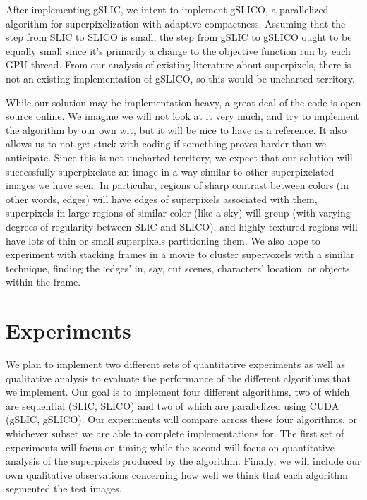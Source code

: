 \documentclass[11pt]{article}
\begin{document}
After implementing gSLIC, we intent to implement gSLICO, a parallelized algorithm for superpixelization with adaptive compactness. Assuming that the step from SLIC to SLICO is small, the step from gSLIC to gSLICO ought to be equally small since it's primarily a change to the objective function run by each GPU thread. From our analysis of existing literature about superpixels, there is not an existing implementation of gSLICO, so this would be uncharted territory.

While our solution may be implementation heavy, a great deal of the code is open source online. We imagine we will not look at it very much, and try to implement the algorithm by our own wit, but it will be nice to have as a reference. It also allows us to not get stuck with coding if something proves harder than we anticipate. Since this is not uncharted territory, we expect that our solution will successfully superpixelate an image in a way similar to other superpixelated images we have seen. In particular, regions of sharp contrast between colors (in other words, edges) will have edges of superpixels associated with them, superpixels in large regions of similar color (like a sky) will group (with varying degrees of regularity between SLIC and SLICO), and highly textured regions will have lots of thin or small superpixels partitioning them. We also hope to experiment with stacking frames in a movie to cluster supervoxels with a similar technique, finding the `edges' in, say, cut scenes, characters' location, or objects within the frame.

\section {Experiments}\label{exper}

We plan to implement two different sets of quantitative experiments as well as qualitative analysis to evaluate the performance of the different algorithms that we implement. Our goal is to implement four different algorithms, two of which are sequential (SLIC, SLICO) and two of which are parallelized using CUDA (gSLIC, gSLICO). Our experiments will compare across these four algorithms, or whichever subset we are able to complete implementations for. The first set of experiments will focus on timing while the second will focus on quantitative analysis of the superpixels produced by the algorithm. Finally, we will include our own qualitative observations concerning how well we think that each algorithm segmented the test images.
\end{document}
